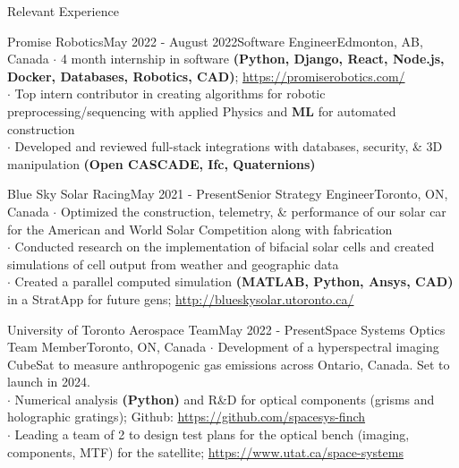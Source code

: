 \documentclass[UTF8]{resume} %
\begin{document}
\begin{rSection}{Relevant Experience}
\begin{rSubsection}{Promise Robotics}{May 2022 - August 2022}{Software Engineer}{Edmonton, AB, Canada}
    $\cdot$ 4 month internship in software \textbf{(Python, Django, React, Node.js, Docker, Databases, Robotics, CAD)}; \href{https://promiserobotics.com/}{https://promiserobotics.com/}\\
    $\cdot$ Top intern contributor in creating algorithms for robotic preprocessing/sequencing with applied Physics and \textbf{ML} for automated construction  \\
    $\cdot$ Developed and reviewed full-stack integrations with databases, security, \& 3D manipulation \textbf{(Open CASCADE, Ifc, Quaternions)}
\end{rSubsection}
\begin{rSubsection}{Blue Sky Solar Racing}{May 2021 - Present}{Senior Strategy Engineer}{Toronto, ON, Canada}
    $\cdot$ Optimized the construction, telemetry, \& performance of our solar car for the American and World Solar Competition along with fabrication\\
    $\cdot$ Conducted research on the implementation of bifacial solar cells and created simulations of cell output from weather and geographic data\\
    $\cdot$ Created a parallel computed simulation \textbf{(MATLAB, Python, Ansys, CAD)} in a StratApp for future gens; \href{http://blueskysolar.utoronto.ca/}{http://blueskysolar.utoronto.ca/}
\end{rSubsection}
\begin{rSubsection}{University of Toronto Aerospace Team}{May 2022 - Present}{Space Systems Optics Team Member}{Toronto, ON, Canada}
    $\cdot$ Development of a hyperspectral imaging CubeSat to measure anthropogenic gas emissions across Ontario, Canada. Set to launch in 2024. \\
    $\cdot$ Numerical analysis \textbf{(Python)} and R\&D for optical components (grisms and holographic gratings); Github: \href{https://github.com/spacesys-finch}{https://github.com/spacesys-finch}\\
    $\cdot$ Leading a team of 2 to design test plans for the optical bench (imaging, components, MTF) for the satellite; \href{https://www.utat.ca/space-systems}{https://www.utat.ca/space-systems}
\end{rSubsection}
\end{rSection}
\end{document}
